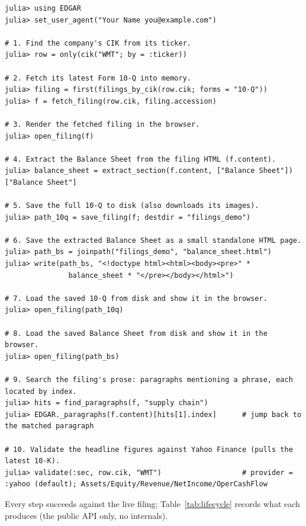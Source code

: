 \documentclass[11pt,a4paper]{report}
\begin{document}
\begin{lstlisting}
julia> using EDGAR
julia> set_user_agent("Your Name you@example.com")   

# 1. Find the company's CIK from its ticker.
julia> row = only(cik("WMT"; by = :ticker))

# 2. Fetch its latest Form 10-Q into memory.
julia> filing = first(filings_by_cik(row.cik; forms = "10-Q"))
julia> f = fetch_filing(row.cik, filing.accession)

# 3. Render the fetched filing in the browser.
julia> open_filing(f)

# 4. Extract the Balance Sheet from the filing HTML (f.content).
julia> balance_sheet = extract_section(f.content, ["Balance Sheet"])["Balance Sheet"]

# 5. Save the full 10-Q to disk (also downloads its images).
julia> path_10q = save_filing(f; destdir = "filings_demo")

# 6. Save the extracted Balance Sheet as a small standalone HTML page.
julia> path_bs = joinpath("filings_demo", "balance_sheet.html")
julia> write(path_bs, "<!doctype html><html><body><pre>" *
               balance_sheet * "</pre></body></html>")

# 7. Load the saved 10-Q from disk and show it in the browser.
julia> open_filing(path_10q)

# 8. Load the saved Balance Sheet from disk and show it in the browser.
julia> open_filing(path_bs)

# 9. Search the filing's prose: paragraphs mentioning a phrase, each located by index.
julia> hits = find_paragraphs(f, "supply chain")
julia> EDGAR._paragraphs(f.content)[hits[1].index]      # jump back to the matched paragraph

# 10. Validate the headline figures against Yahoo Finance (pulls the latest 10-K).
julia> validate(:sec, row.cik, "WMT")                   # provider = :yahoo (default); Assets/Equity/Revenue/NetIncome/OperCashFlow
\end{lstlisting}

\noindent Every step succeeds against the live filing; Table~\ref{tab:lifecycle}
records what each produces (the public API only, no internals).
\end{document}
